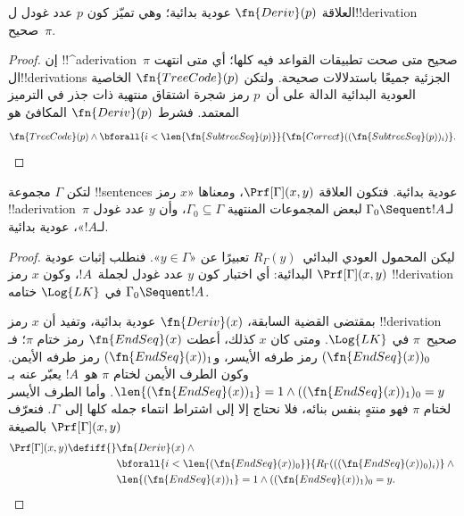 \documentclass[../../../include/open-logic-section]{subfiles}
\begin{document}
\begin{prop}
  العلاقة $\fn{Deriv}(p)$ عودية بدائية؛ وهي
  تميّز كون $p$ عدد غودل ل!!{derivation} صحيح~$\pi$.
\end{prop}

\begin{proof}
  إن !!^a{derivation}~$\pi$ صحيح متى صحت
  تطبيقات القواعد فيه كلها؛ أي متى انتهت
  ال!!{derivation}s الجزئية جميعًا باستدلالات
  صحيحة. ولتكن $\fn{TreeCode}(p)$ الخاصية العودية البدائية الدالة
  على أن~$p$ رمز شجرة اشتقاق منتهية ذات جذر في الترميز المعتمد.
  فشرط $\fn{Deriv}(p)$ المكافئ هو
  \[
  \fn{TreeCode}(p) \land
  \bforall{i<\len{\fn{SubtreeSeq}(p)}}{\fn{Correct}((\fn{SubtreeSeq}(p))_i)}.
  \]
\end{proof}

\begin{prop}
لتكن $\Gamma$ مجموعة !!{sentence}s عودية بدائية.
فتكون العلاقة $\Prf[\Gamma](x,y)$، ومعناها «$x$ رمز
!!a{derivation}~$\pi$ لـ$\Gamma_0 \Sequent !A$ لبعض المجموعات المنتهية
$\Gamma_0\subseteq\Gamma$، وأن $y$ عدد غودل لـ$!A$»، عودية بدائية.
\end{prop}

\begin{proof}
ليكن المحمول العودي البدائي~$R_\Gamma(y)$
تعبيرًا عن «$y\in\Gamma$».
فنطلب إثبات عودية $\Prf[\Gamma](x,y)$
البدائية: أي اختبار كون $y$ عدد غودل
لجملة~$!A$، وكون $x$ رمز !!{derivation}
في $\Log{LK}$ ختامه $\Gamma_0 \Sequent !A$.

بمقتضى القضية السابقة، $\fn{Deriv}(x)$
عودية بدائية، وتفيد أن $x$ رمز
!!{derivation} صحيح~$\pi$ في $\Log{LK}$.
ومتى كان $x$ كذلك، أعطت $\fn{EndSeq}(x)$
رمز ختام $\pi$؛ فـ$(\fn{EndSeq}(x))_0$
رمز طرفه الأيسر، و$(\fn{EndSeq}(x))_1$
رمز طرفه الأيمن. وكون الطرف الأيمن
لختام $\pi$ هو~$!A$ يعبّر عنه بـ
$\len{(\fn{EndSeq}(x))_1}=1 \land ((\fn{EndSeq}(x))_1)_0=y$.
وأما الطرف الأيسر لختام $\pi$ فهو
منتهٍ بنفس بنائه، فلا نحتاج إلا إلى
اشتراط انتماء جمله كلها إلى~$\Gamma$.
فنعرّف $\Prf[\Gamma](x,y)$ بالصيغة
\begin{align*}
\Prf[\Gamma](x, y) \defiff {}&
\fn{Deriv}(x) \land {} \\
& \bforall{i <
  \len{(\fn{EndSeq}(x))_0}}{R_\Gamma(((\fn{EndSeq}(x))_0)_i)} \land {}\\
& \len{(\fn{EndSeq}(x))_1} = 1 \land ((\fn{EndSeq}(x))_1)_0 = y.
\end{align*}
\end{proof}
\end{document}

